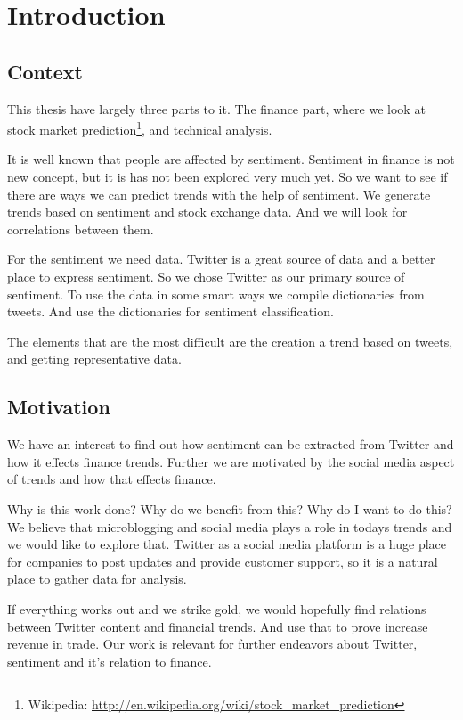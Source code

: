 \chapter{Introduction}\label{introduction}

\section{Context}
This thesis have largely three parts to it. The finance part, where we look at
stock market prediction\footnote{Wikipedia:
\url{http://en.wikipedia.org/wiki/stock_market_prediction}}, and technical
analysis.  

It is well known that people are affected by sentiment. Sentiment in finance is
not new concept, but it is has not been explored very much yet. So we want to
see if there are ways we can predict trends with the help of sentiment. We
generate trends based on sentiment and stock exchange data. And we will look for
correlations between them. 

For the sentiment we need data. Twitter is a great source of data and a better
place to express sentiment. So we chose Twitter as our primary source of
sentiment. To use the data in some smart ways we compile dictionaries from
tweets. And use the dictionaries for sentiment classification. 

The elements that are the most difficult are the creation a trend based on
tweets, and getting representative data. 
%

\section{Motivation}
We have an interest to find out how sentiment can be extracted from Twitter and
how it effects finance trends. Further we are motivated by the social media
aspect of trends and how that effects finance. 

Why is this work done? Why do we benefit from this? Why do I want to do this?
We believe that microblogging and social media plays a role in todays trends
and we would like to explore that. Twitter as a social media platform is a huge
place for companies to post updates and provide customer support, so it is a
natural place to gather data for analysis. 

If everything works out and we strike gold, we would hopefully find relations
between Twitter content and financial trends. And use that to prove increase
revenue in trade. Our work is relevant for further endeavors about Twitter,
sentiment and it's relation to finance. 

